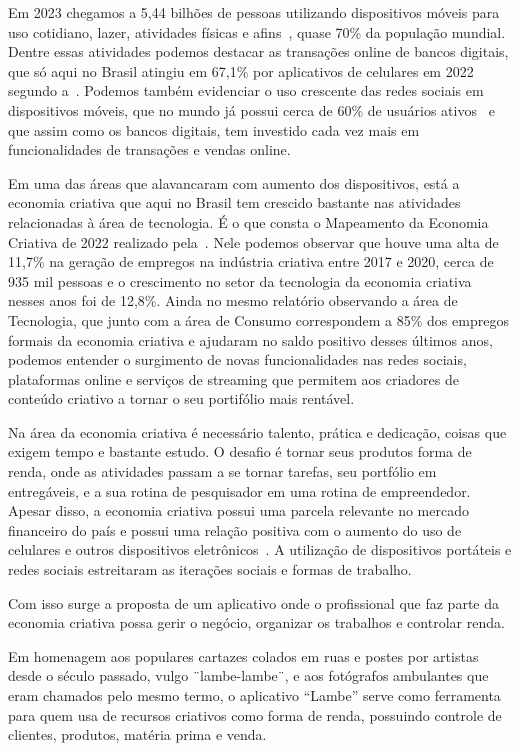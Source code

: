 Em 2023 chegamos a 5,44 bilhões de pessoas utilizando dispositivos móveis para uso cotidiano, lazer, atividades físicas e afins~\cite{wearesocial}, quase 70\% da população mundial.
Dentre essas atividades podemos destacar as transações online de bancos digitais, que só aqui no Brasil atingiu em 67,1\% por aplicativos de celulares em 2022 segundo a~.
Podemos também evidenciar o uso crescente das redes sociais em dispositivos móveis, que no mundo já possui cerca de 60\% de usuários ativos~\cite{wearesocial} e que assim como os bancos digitais, tem investido cada vez mais em funcionalidades de transações e vendas online.

Em uma das áreas que alavancaram com aumento dos dispositivos, está a economia criativa que aqui no Brasil tem crescido bastante nas atividades relacionadas à área de tecnologia.
É o que consta o Mapeamento da Economia Criativa de 2022 realizado pela~.
Nele podemos observar que houve uma alta de 11,7\% na geração de empregos na indústria criativa entre 2017 e 2020, cerca de 935 mil pessoas e o crescimento no setor da tecnologia da economia criativa nesses anos foi de 12,8\%.
Ainda no mesmo relatório observando a área de Tecnologia, que junto com a área de Consumo correspondem a 85\% dos empregos formais da economia criativa e ajudaram no saldo positivo desses últimos anos, podemos entender o surgimento de novas funcionalidades nas redes sociais, plataformas online e serviços de streaming que permitem aos criadores de conteúdo criativo a tornar o seu portifólio mais rentável.

Na área da economia criativa é necessário talento, prática e dedicação, coisas que exigem tempo e bastante estudo.
O desafio é tornar seus produtos forma de renda, onde as atividades passam a se tornar tarefas, seu portfólio em entregáveis, e a sua rotina de pesquisador em uma rotina de empreendedor.
Apesar disso, a economia criativa possui uma parcela relevante no mercado financeiro do país e possui uma relação positiva com o aumento do uso de celulares e outros dispositivos eletrônicos~.
A utilização de dispositivos portáteis e redes sociais estreitaram as iterações sociais e formas de trabalho.

Com isso surge a proposta de um aplicativo onde o profissional que faz parte da economia criativa possa gerir o negócio, organizar os trabalhos e controlar renda.

Em homenagem aos populares cartazes colados em ruas e postes por artistas desde o século passado, vulgo ¨lambe-lambe¨, e aos fotógrafos ambulantes que eram chamados pelo mesmo termo, o aplicativo “Lambe” serve como ferramenta para quem usa de recursos criativos como forma de renda, possuindo controle de clientes, produtos, matéria prima e venda.

